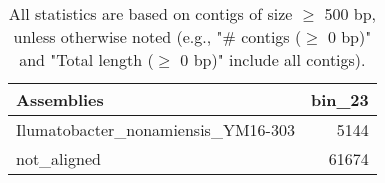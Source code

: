 \documentclass[12pt,a4paper]{article}
\begin{document}
\begin{table}[ht]
\begin{center}
\caption{All statistics are based on contigs of size $\geq$ 500 bp, unless otherwise noted (e.g., "\# contigs ($\geq$ 0 bp)" and "Total length ($\geq$ 0 bp)" include all contigs).}
\begin{tabular}{|l*{1}{|r}|}
\hline
Assemblies & bin\_23 \\ \hline
Ilumatobacter\_nonamiensis\_YM16-303 & 5144 \\ \hline
not\_aligned & 61674 \\ \hline
\end{tabular}
\end{center}
\end{table}
\end{document}
